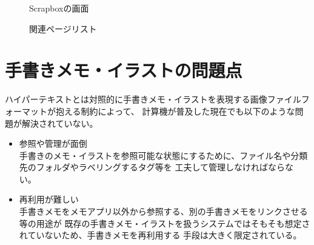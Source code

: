 \begin{figure}[htbp] \begin{minipage}{0.5\hsize}
                         \begin{center} 
                         \end{center} \caption{Scrapboxの画面} \label{fig:scrapbox1}
\end{minipage} \begin{minipage}{0.5\hsize}
                   \begin{center} 
                   \end{center} \caption{関連ページリスト} \label{fig:scrapbox2}
\end{minipage}
\end{figure}

\section{手書きメモ・イラストの問題点}
\label{mondai}
ハイパーテキストとは対照的に手書きメモ・イラストを表現する画像ファイルフォーマットが抱える制約によって、
計算機が普及した現在でも以下のような問題が解決されていない。
\begin{itemize}
    \item 参照や管理が面倒\\
    手書きのメモ・イラストを参照可能な状態にするために、ファイル名や分類先のフォルダやラベリングするタグ等を
    工夫して管理しなければならない。
    \item 再利用が難しい\\
    手書きメモをメモアプリ以外から参照する、別の手書きメモをリンクさせる等の用途が
    既存の手書きメモ・イラストを扱うシステムではそもそも想定されていないため、手書きメモを再利用する
    手段は大きく限定されている。
\end{itemize}



